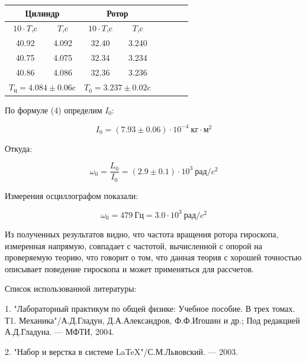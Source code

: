 \documentclass[14pt]{article}
\begin{document}
\vspace{0.5cm}
\begin{center}
\begin{tabular}{|c|c|c|c|c|c|c|c|}
\hline
\multicolumn{2}{|c}{Цилиндр}		&	\multicolumn{2}{|c|}{Ротор}												\\
\hline
$10\cdot T$,c	&	$T$,c			&	$10\cdot T$,c	&	$T$,c												\\
\hline
40.92			&	4.092			&	32.40			&	3.240												\\
\hline
40.75			&	4.075			&	32.34			&	3.234												\\
\hline
40.86			&	4.086			&	32.36			&	3.236												\\
\hline
\multicolumn{2}{|c}{$T_\text{ц} = 4.084 \pm 0.06$c}	&	\multicolumn{2}{|c|}{$T_0 = 3.237 \pm 0.02$c}		\\
\hline
\end{tabular}
\end{center}

\vspace{0.5cm}
По формуле (4) определим $I_0$:

$$\boxed{I_0 = (7.93 \pm 0.06)\cdot 10^{-4}~\text{кг}\cdot\text{м}^2}$$

Откуда:

$$\omega_0 = \frac{L_0}{I_0} = (2.9 \pm 0.1)\cdot 10^{3}~\text{рад}/c^2$$

Измерения осциллографом показали:

$$\omega_0 = 479~\text{Гц} = 3.0 \cdot 10^{3}~\text{рад}/c^2$$

\vspace{1cm}

Из полученных результатов видно, что частота вращения ротора гироскопа, измеренная напрямую, совпадает с частотой, вычисленной с опорой на проверяемую теорию, что говорит о том, что данная теория с хорошей точностью описывает поведение гироскопа и может применяться для рассчетов.

\newpage
Список использованной литературы:
	
\vspace{0.5cm}
1. "Лабораторный практикум по общей физике: Учебное пособие. В трех томах. Т1. Механика"/А.Д.Гладун, Д.А.Александров,
Ф.Ф.Игошин и др.; Под редакцией А.Д.Гладуна. --- МФТИ, 2004.

2. "Набор и верстка в системе \LaTeX "/С.М.Львовский. --- 2003.
\end{document}
